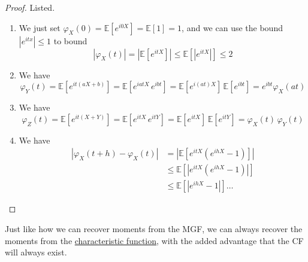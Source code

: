 	\begin{proof}
		Listed. 
		\begin{enumerate}
			\item We just set $\varphi_X (0) = \mathbb{E}[e^{i 0 X}] = \mathbb{E}[1] = 1$, and we can use the bound $|e^{itx}| \leq 1$ to bound 
				\begin{equation}
					|\varphi_X (t)| = |\mathbb{E}[e^{itX}]| \leq \mathbb{E}[|e^{itX}|] \leq 2
				\end{equation}
			
			\item We have 
			\begin{equation}
				\varphi_Y (t) = \mathbb{E}[ e^{i t (a X + b)}] = \mathbb{E}[ e^{i a t X} \, e^{i b t}] = \mathbb{E}[ e^{i (at) X}] \, \mathbb{E}[e^{i b t}] = e^{i b t} \varphi_X (a t)
			\end{equation}
			
			\item We have 
			\begin{equation}
				\varphi_Z (t) = \mathbb{E}[ e^{i t (X + Y)}] = \mathbb{E}[ e^{i t X} \, e^{i t Y}] = \mathbb{E}[e^{i t X}] \, \mathbb{E}[e^{i t Y}] = \varphi_X (t) \, \varphi_Y (t)
			\end{equation}
			
			\item We have 
			\begin{align*}
				| \varphi_X (t + h) - \varphi_X (t)| & = | \mathbb{E} [ e^{i tX} (e^{i h X} - 1)] | \\ 
				& \leq \mathbb{E}[ | e^{i tX} (e^{i h X} - 1)|] \\
				& \leq \mathbb{E}[ |e^{i h X} - 1|] \ldots
			\end{align*}
		\end{enumerate}
	\end{proof}

	Just like how we can recover moments from the MGF, we can always recover the moments from the \hyperref[def:characteristic-function]{characteristic function}, with the added advantage that the CF will always exist. 

